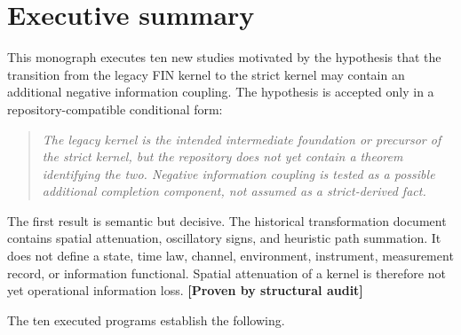 \documentclass[11pt,a4paper,openany]{report}
\begin{document}
\chapter{Executive summary}

This monograph executes ten new studies motivated by the hypothesis that the transition from the legacy FIN kernel to the strict kernel may contain an additional negative information coupling. The hypothesis is accepted only in a repository-compatible conditional form:

\begin{quote}\itshape
The legacy kernel is the intended intermediate foundation or precursor of the strict kernel, but the repository does not yet contain a theorem identifying the two. Negative information coupling is tested as a possible additional completion component, not assumed as a strict-derived fact.

\end{quote}

The first result is semantic but decisive. The historical transformation document contains spatial attenuation, oscillatory signs, and heuristic path summation. It does not define a state, time law, channel, environment, instrument, measurement record, or information functional. Spatial attenuation of a kernel is therefore not yet operational information loss. \textbf{[Proven by structural audit]}

The ten executed programs establish the following.
\end{document}
